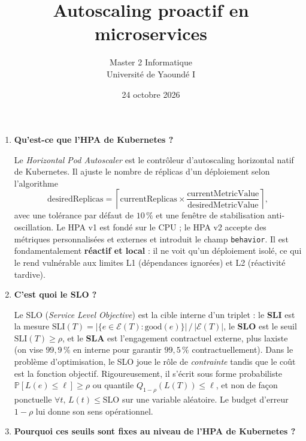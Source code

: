 \documentclass[11pt,a4paper]{article}
\title{\vspace{-1.5cm}\textbf{Autoscaling proactif en microservices}\\}
\author{Master 2 Informatique\\Université de Yaoundé I}
\date{24 octobre 2026}
\begin{document}
\maketitle
\vspace{-0.5cm}

\begin{enumerate}[label=\textbf{Q\arabic*.}, leftmargin=*, itemsep=0.6em]

\item \textbf{Qu'est-ce que l'HPA de Kubernetes ?}

Le \emph{Horizontal Pod Autoscaler} est le contrôleur d'autoscaling horizontal natif de Kubernetes. Il ajuste le nombre de réplicas d'un déploiement selon l'algorithme
\[
 \text{desiredReplicas} = \left\lceil \text{currentReplicas} \times \frac{\text{currentMetricValue}}{\text{desiredMetricValue}} \right\rceil,
\]
avec une tolérance par défaut de \(10\,\%\) et une fenêtre de stabilisation anti-oscillation. Le HPA v1 est fondé sur le CPU ; le HPA v2 accepte des métriques personnalisées et externes et introduit le champ \texttt{behavior}. Il est fondamentalement \textbf{réactif et local} : il ne voit qu'un déploiement isolé, ce qui le rend vulnérable aux limites L1 (dépendances ignorées) et L2 (réactivité tardive).

\item \textbf{C'est quoi le SLO ?}

Le SLO (\emph{Service Level Objective}) est la cible interne d'un triplet : le \textbf{SLI} est la mesure \( \text{SLI}(T) = |\{e \in \mathcal{E}(T) : \text{good}(e)\}| \,/\, |\mathcal{E}(T)| \), le \textbf{SLO} est le seuil \( \text{SLI}(T) \ge \rho \), et le \textbf{SLA} est l'engagement contractuel externe, plus laxiste (on vise \(99{,}9\,\%\) en interne pour garantir \(99{,}5\,\%\) contractuellement). Dans le problème d'optimisation, le SLO joue le rôle de \emph{contrainte} tandis que le coût est la fonction objectif. Rigoureusement, il s'écrit sous forme probabiliste \( \mathbb{P}[L(e) \le \ell] \ge \rho \) ou quantile \( Q_{1-\rho}(L(T)) \le \ell \), et non de façon ponctuelle \( \forall t,\, L(t) \le \text{SLO} \) sur une variable aléatoire. Le budget d'erreur \( 1-\rho \) lui donne son sens opérationnel.

\item \textbf{Pourquoi ces seuils sont fixes au niveau de l'HPA de Kubernetes ?}


\end{enumerate}
\end{document}
